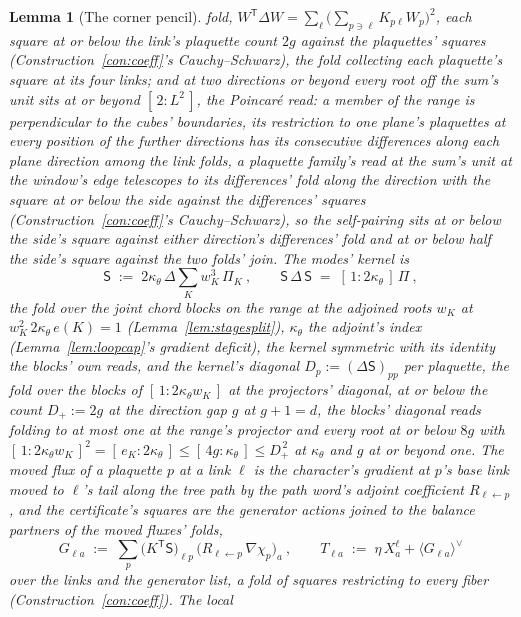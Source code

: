 \documentclass[11pt]{article}
\newtheorem{lemma}{Lemma}
\theoremstyle{definition}
\begin{document}
\begin{lemma}[The corner pencil]
fold, $W^{\mathsf T}\Delta W=\sum_\ell\big(\sum_{p\ni\ell}K_{p\ell}
W_p\big)^{2}$, each square at or below the link's plaquette count
$2g$ against the plaquettes' squares (Construction~\ref{con:coeff}'s
Cauchy--Schwarz), the fold collecting each plaquette's square at its
four links; and at two directions or beyond every root off the
sum's unit sits at or beyond $[\,2:L^{2}\,]$, the \emph{Poincar\'e
read}: a member of the range is perpendicular to the cubes'
boundaries, its restriction to one plane's plaquettes at every
position of the further directions has its consecutive differences
along each plane direction among the link folds, a plaquette
family's read at the sum's unit at the window's edge telescopes to
its differences' fold along the direction with the square at or
below the side against the differences' squares
(Construction~\ref{con:coeff}'s Cauchy--Schwarz), so the self-pairing
sits at or below the side's square against either direction's
differences' fold and at or below half the side's square against the
two folds' join.
The \emph{modes' kernel} is
\[
\mathsf S\;:=\;2\kappa_\theta\,\Delta\sum_{K}w_K^{3}\,\Pi_K\ ,
\qquad
\mathsf S\,\Delta\,\mathsf S\;=\;[\,1:2\kappa_\theta\,]\,\Pi\ ,
\]
the fold over the joint chord blocks on the range at the
adjoined roots $w_K$ at $w_K^{2}\,2\kappa_\theta\,e(K)=1$
(Lemma~\ref{lem:stagesplit}), $\kappa_\theta$ the adjoint's index
(Lemma~\ref{lem:loopcap}'s gradient deficit), the kernel symmetric
with its identity the blocks' own reads, and the \emph{kernel's
diagonal} $D_p:=(\Delta\mathsf S)_{pp}$ per plaquette, the fold over
the blocks of $[\,1:2\kappa_\theta w_K\,]$ at the projectors'
diagonal, at or below the count $D_+:=2g$ at the direction gap $g$
at $g+1=d$, the blocks' diagonal reads folding to at most one at the
range's projector and every root at or below $8g$ with
$[\,1:2\kappa_\theta w_K\,]^{2}=[\,e_K:2\kappa_\theta\,]
\le[\,4g:\kappa_\theta\,]\le D_+^{\,2}$ at $\kappa_\theta$ and $g$
at or beyond one. The
\emph{moved flux} of a plaquette $p$ at a link $\ell$ is the
character's gradient at $p$'s base link moved to $\ell$'s tail along
the tree path by the path word's adjoint coefficient
$R_{\ell\leftarrow p}$, and the certificate's squares are the
generator actions joined to the balance partners of the moved
fluxes' folds,
\[
G_{\ell a}\;:=\;\sum_p\big(K^{\mathsf T}\mathsf S\big)_{\ell p}\,
\big(R_{\ell\leftarrow p}\,\nabla\chi_p\big)_a\ ,
\qquad
T_{\ell a}\;:=\;\eta\,X_a^{\ell}+\big\langle G_{\ell a}\big\rangle^{\!\vee}
\]
over the links and the generator list, a fold of squares restricting
to every fiber (Construction~\ref{con:coeff}). \emph{The local
}
\end{lemma}
\end{document}
